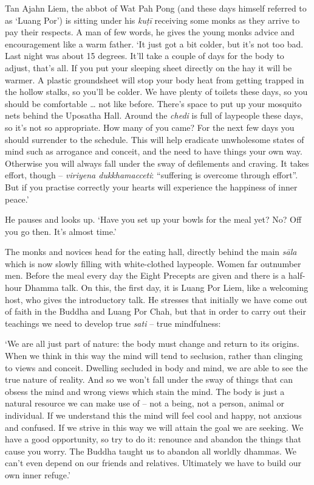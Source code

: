 Tan Ajahn Liem, the abbot of Wat Pah Pong (and these days himself
referred to as `Luang Por') is sitting under his \emph{kuṭī} receiving
some monks as they arrive to pay their respects. A man of few words, he
gives the young monks advice and encouragement like a warm father. `It
just got a bit colder, but it's not too bad. Last night was about 15
degrees. It'll take a couple of days for the body to adjust, that's all. 
If you put your sleeping sheet directly on the hay it will be warmer. A
plastic groundsheet will stop your body heat from getting trapped in the
hollow stalks, so you'll be colder. We have plenty of toilets these
days, so you should be comfortable \ldots{} not like before. There's
space to put up your mosquito nets behind the Uposatha Hall. Around the
\emph{chedi} is full of laypeople these days, so it's not so
appropriate. How many of you came? For the next few days you should
surrender to the schedule. This will help eradicate unwholesome states
of mind such as arrogance and conceit, and the need to have things your
own way. Otherwise you will always fall under the sway of defilements
and craving. It takes effort, though -- \emph{viriyena dukkhamacceti}: 
``suffering is overcome through effort''. But if you practise correctly
your hearts will experience the happiness of inner peace.'

He pauses and looks up. `Have you set up your bowls for the meal yet? 
No? Off you go then. It's almost time.'

The monks and novices head for the eating hall, directly behind the main
\emph{sāla} which is now slowly filling with white-clothed laypeople. 
Women far outnumber men. Before the meal every day the Eight Precepts
are given and there is a half-hour Dhamma talk. On this, the first day, 
it is Luang Por Liem, like a welcoming host, who gives the introductory
talk. He stresses that initially we have come out of faith in the Buddha
and Luang Por Chah, but that in order to carry out their teachings we
need to develop true \emph{sati} -- true mindfulness: 

`We are all just part of nature: the body must change and return to its
origins. When we think in this way the mind will tend to seclusion, 
rather than clinging to views and conceit. Dwelling secluded in body and
mind, we are able to see the true nature of reality. And so we won't
fall under the sway of things that can obsess the mind and wrong views
which stain the mind. The body is just a natural resource we can make
use of -- not a being, not a person, animal or individual. If we
understand this the mind will feel cool and happy, not anxious and
confused. If we strive in this way we will attain the goal we are
seeking. We have a good opportunity, so try to do it: renounce and
abandon the things that cause you worry. The Buddha taught us to abandon
all worldly dhammas. We can't even depend on our friends and relatives. 
Ultimately we have to build our own inner refuge.'

